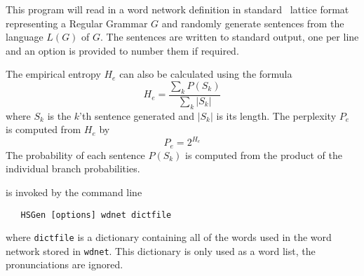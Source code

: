 %
%

\newpage
{}


This program will read in a word network definition in standard 
\HTK\ lattice format representing a Regular Grammar $G$ and randomly
generate sentences from the language $L(G)$ of $G$.  The sentences are
written to standard output, one per line and an option is provided
to number them if required.

The empirical entropy $H_e$ can also be calculated using the formula
\begin{equation}
  H_e = \frac{\sum_k P(S_k)}{\sum_k |S_k|}
\end{equation}
where $S_k$ is the $k$'th sentence generated and $|S_k|$ is its length.
The perplexity $P_e$ is computed from $H_e$ by
\begin{equation}
  P_e = 2^{H_e}
\end{equation}
The probability of each sentence $P(S_k)$ is computed from the product of
the individual branch probabilities.



 is invoked by the command line
\begin{verbatim}
   HSGen [options] wdnet dictfile
\end{verbatim}
where \texttt{dictfile} is a dictionary containing all of the words
used in the word network stored in \texttt{wdnet}.  This dictionary
is only used as a word list, the pronunciations are ignored.

